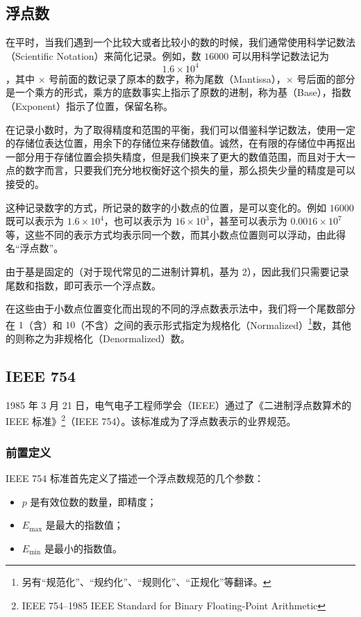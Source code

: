    \subsection{浮点数}\label{subsec:NumberSystemBasics/fixed-point-and-floating-point/floating-point}
        在平时，当我们遇到一个比较大或者比较小的数的时候，我们通常使用科学记数法（Scientific Notation）来简化记录。例如，数 $16000$ 可以用科学记数法记为
        \[1.6 \times 10^4\]
        ，其中 $\times$ 号前面的数记录了原本的数字，称为尾数（Mantissa），$\times$ 号后面的部分是一个乘方的形式，乘方的底数事实上指示了原数的进制，称为基（Base），指数（Exponent）指示了位置，保留名称。

        在记录小数时，为了取得精度和范围的平衡，我们可以借鉴科学记数法，使用一定的存储位表达位置，用余下的存储位来存储数值。诚然，在有限的存储位中再抠出一部分用于存储位置会损失精度，但是我们换来了更大的数值范围，而且对于大一点的数字而言，只要我们充分地权衡好这个损失的量，那么损失少量的精度是可以接受的。

        这种记录数字的方式，所记录的数字的小数点的位置，是可以变化的。例如 $16000$ 既可以表示为 $1.6 \times 10^4$，也可以表示为 $16 \times 10^3$，甚至可以表示为 $0.0016 \times 10^7$ 等，这些不同的表示方式均表示同一个数，而其小数点位置则可以浮动，由此得名“浮点数”。

        由于基是固定的（对于现代常见的二进制计算机，基为 $2$），因此我们只需要记录尾数和指数，即可表示一个浮点数。

        在这些由于小数点位置变化而出现的不同的浮点数表示法中，我们将一个尾数部分在 $1$（含）和 $10$（不含）之间的表示形式指定为规格化（Normalized）\footnote{另有“规范化”、“规约化”、“规则化”、“正规化”等翻译。}数，其他的则称之为非规格化（Denormalized）数。
    \subsection{IEEE 754}\label{subsec:NumberSystemBasics/fixed-point-and-floating-point/ieee-754}
        1985 年 3 月 21 日，电气电子工程师学会（IEEE）通过了《二进制浮点数算术的 IEEE 标准》\footnote{IEEE 754--1985 IEEE Standard for Binary Floating-Point Arithmetic\cite{ieee754-1985}}（IEEE 754）。该标准成为了浮点数表示的业界规范。

        \subsubsection{前置定义}\label{subsubsec:NumberSystemBasics/fixed-point-and-floating-point/ieee-754/predef}
            IEEE 754 标准首先定义了描述一个浮点数规范的几个参数：
            \begin{itemize}
                \item $p$ 是有效位数的数量，即精度；
                \item $E_{\max}$ 是最大的指数值；
                \item $E_{\min}$ 是最小的指数值。
            \end{itemize}

